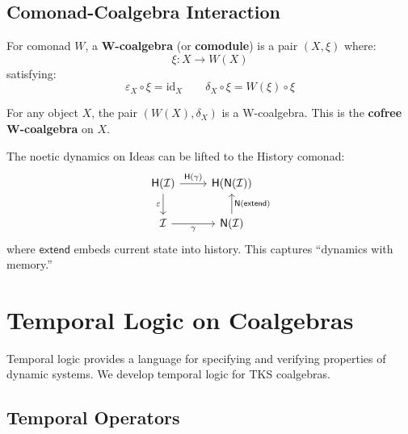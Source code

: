 \subsection{Comonad-Coalgebra Interaction}
\label{subsec:comonad-coalgebra}

\begin{definition}[W-Coalgebra]
\label{def:w-coalgebra}
For comonad $W$, a \textbf{W-coalgebra} (or \textbf{comodule}) is a pair $(X, \xi)$ where:
\[
  \xi : X \to W(X)
\]
satisfying:
\[
  \varepsilon_X \circ \xi = \mathrm{id}_X \qquad \delta_X \circ \xi = W(\xi) \circ \xi
\]
\end{definition}

\begin{proposition}
\label{prop:cofree-coalgebra}
For any object $X$, the pair $(W(X), \delta_X)$ is a W-coalgebra. This is the
\textbf{cofree W-coalgebra} on $X$.
\end{proposition}

\begin{theorem}
\label{thm:comonadic-dynamics}
The noetic dynamics on Ideas can be lifted to the History comonad:
\[
\begin{tikzcd}
  \mathsf{H}(\mathcal{I}) \arrow[r, "\mathsf{H}(\gamma)"] \arrow[d, "\varepsilon"']
  & \mathsf{H}(\mathsf{N}(\mathcal{I})) \\
  \mathcal{I} \arrow[r, "\gamma"']
  & \mathsf{N}(\mathcal{I}) \arrow[u, "\mathsf{N}(\mathsf{extend})"']
\end{tikzcd}
\]
where $\mathsf{extend}$ embeds current state into history. This captures
``dynamics with memory.''
\end{theorem}

\section{Temporal Logic on Coalgebras}
\label{sec:temporal-logic}

Temporal logic provides a language for specifying and verifying properties of
dynamic systems. We develop temporal logic for TKS coalgebras.

\subsection{Temporal Operators}
\label{subsec:temporal-operators}

